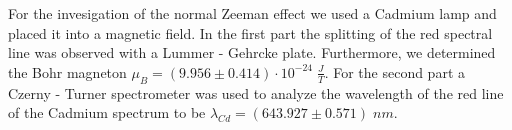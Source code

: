 \documentclass[11pt,a4paper]{article}
\begin{document}
For the invesigation of the normal Zeeman effect we used a Cadmium lamp and placed it into a magnetic field. In the first part the splitting of the red spectral line was observed with a Lummer - Gehrcke plate. Furthermore, we determined the Bohr magneton $\mu_B = (9.956 \pm 0.414) \cdot 10^{-24} \; \frac{J}{T}$. For the second part a Czerny - Turner spectrometer was used to analyze the wavelength of the red line of the Cadmium spectrum to be $\lambda_{Cd} = (643.927 \pm 0.571) \; nm$. 
\end{document}
